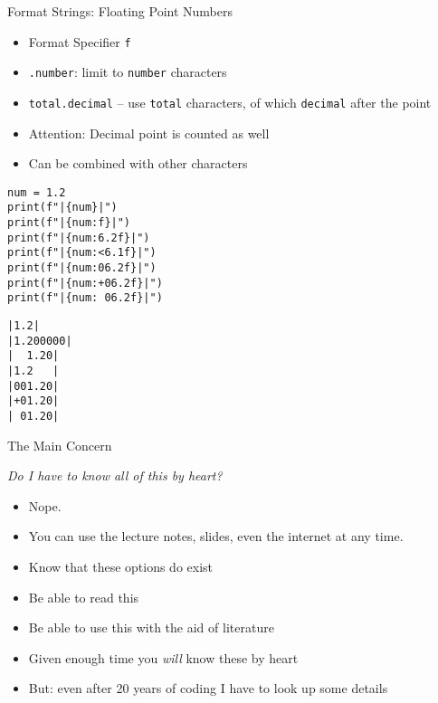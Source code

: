 \begin{frame}[fragile]{Format Strings: Floating Point Numbers}
%
\begin{itemize}
\item Format Specifier \texttt{f}
\item \texttt{.number}: limit to \texttt{number} characters
\item \texttt{total.decimal} -- use \texttt{total} characters, of which \texttt{decimal} after the point
\item Attention: Decimal point is counted as well
\item Can be combined with other characters
\end{itemize}
%
\begin{codebox}[Code: Format Strings (4), width=.49\linewidth, nobeforeafter, equal height group = grpFormatString4]
\begin{verbatim}
num = 1.2
print(f"|{num}|")
print(f"|{num:f}|")
print(f"|{num:6.2f}|")
print(f"|{num:<6.1f}|")
print(f"|{num:06.2f}|")
print(f"|{num:+06.2f}|")
print(f"|{num: 06.2f}|")
\end{verbatim}
\end{codebox}
%
\begin{cmdbox}[Output: Format Strings (4), width=.49\linewidth, nobeforeafter, equal height group = grpFormatString4]
\begin{verbatim}
|1.2|
|1.200000|
|  1.20|
|1.2   |
|001.20|
|+01.20|
| 01.20|
\end{verbatim}
\end{cmdbox}
%
\end{frame}


\begin{frame}{The Main Concern}
%
\begin{center}
\begin{Large}
\emph{Do I have to know all of this by heart?}
\end{Large}
\end{center}
%
\begin{itemize}
\item Nope.
\item You can use the lecture notes, slides, even the internet at any time.
\item Know that these options do exist
\item Be able to read this
\item Be able to use this with the aid of literature
\item Given enough time you \emph{will} know these by heart
\item But: even after 20 years of coding I have to look up some details
\end{itemize}
%
\end{frame}

